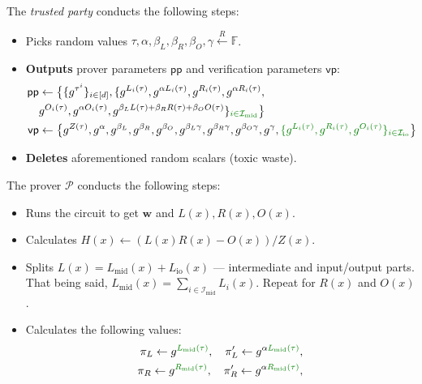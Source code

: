 \documentclass[../lecture-notes.tex]{subfiles}
\begin{document}
\begin{tcolorbox}
    The \emph{trusted party} conducts the following steps:
    \begin{itemize}[label=]
        \item Picks random values $\tau, \alpha, \beta_L, \beta_R, \beta_O, \gamma \xleftarrow{R} \mathbb{F}$.
        \item \textbf{Outputs} prover parameters $\mathsf{pp}$ and verification parameters $\mathsf{vp}$:
        \begin{align*}
            \mathsf{pp} &\gets \big\{\{g^{\tau^i}\}_{i \in [d]}, \{g^{L_i(\tau)}, g^{\alpha L_i(\tau)}, g^{R_i(\tau)}, g^{\alpha R_i(\tau)}, \\ 
            & g^{O_i(\tau)}, g^{\alpha O_i(\tau)}, g^{\beta_LL(\tau)+\beta_RR(\tau)+\beta_OO(\tau)}\}_{\textcolor{green!50!black}{i \in \mathcal{I}_{\text{mid}}}}\big\} \\
            \mathsf{vp} &\gets \big\{ g^{Z(\tau)}, g^{\alpha}, g^{\beta_L}, g^{\beta_R}, g^{\beta_O}, g^{\beta_L\gamma}, g^{\beta_R\gamma}, g^{\beta_O\gamma}, g^{\gamma}, \textcolor{green!50!black}{ \{g^{L_i(\tau)}, g^{R_i(\tau)}, g^{O_i(\tau)}\}_{i \in \mathcal{I}_{\text{io}}} } \big\}
        \end{align*}
        \item \textbf{Deletes} aforementioned random scalars (toxic waste).
    \end{itemize}
    The prover $\mathcal{P}$ conducts the following steps:
    \begin{itemize}[label=]
        \item Runs the circuit to get $\mathbf{w}$ and $L(x),R(x),O(x)$.
        \item Calculates $H(x) \gets (L(x)R(x) - O(x))\big/ Z(x)$.
        \item \textcolor{green!50!black}{Splits $L(x) = L_{\text{mid}}(x) + L_{\text{io}}(x)$ --- intermediate and input/output parts. That being said, $L_{\text{mid}}(x) = \sum_{i \in \mathcal{I}_{\text{mid}}}L_i(x)$. Repeat for $R(x)$ and $O(x)$.}
        \item Calculates the following values: 
        \begin{align*}
            \pi_L \gets g^{\textcolor{green!50!black}{L_{\text{mid}}(\tau)}}, \quad \pi_L' \gets g^{\alpha \textcolor{green!50!black}{L_{\text{mid}}(\tau)}}, \\
            \pi_R \gets g^{\textcolor{green!50!black}{R_{\text{mid}}(\tau)}}, \quad \pi_R' \gets g^{\alpha \textcolor{green!50!black}{R_{\text{mid}}(\tau)}}, \\

\end{align*}
\end{itemize}
\end{tcolorbox}
\end{document}
